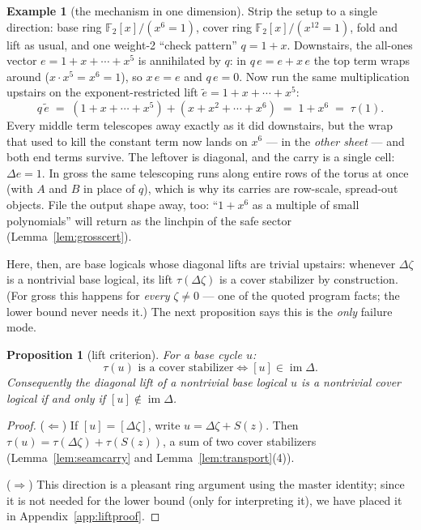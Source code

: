 \documentclass[11pt]{article}
\theoremstyle{plain}
\newtheorem{proposition}[theorem]{Proposition}
\theoremstyle{definition}
\newtheorem{example}[theorem]{Example}
\theoremstyle{remark}
\newcommand{\F}{\mathbb{F}}
\newcommand{\imD}{\operatorname{im}\Delta}
\begin{document}
\begin{example}[the mechanism in one dimension]\label{ex:1d}
Strip the setup to a single direction: base ring $\F_2[x]/(x^{6}{=}1)$,
cover ring $\F_2[x]/(x^{12}{=}1)$, fold and lift as usual, and one weight-2
``check pattern'' $q = 1 + x$. Downstairs, the all-ones vector
$e = 1 + x + \cdots + x^5$ is annihilated by $q$: in $q\,e = e + x\,e$ the
top term wraps around ($x \cdot x^5 = x^6 = 1$), so $x\,e = e$ and
$q\,e = 0$. Now run the same multiplication upstairs on the
exponent-restricted lift $\widetilde e = 1 + x + \cdots + x^5$:
\[
q\,\widetilde e
\;=\; (1 + x + \cdots + x^5) + (x + x^2 + \cdots + x^6)
\;=\; 1 + x^6 \;=\; \tau(1).
\]
Every middle term telescopes away exactly as it did downstairs, but the
wrap that used to kill the constant term now lands on $x^6$ --- in the
\emph{other sheet} --- and both end terms survive. The leftover is
diagonal, and the carry is a single cell: $\Delta e = 1$. In gross the same
telescoping runs along entire rows of the torus at once (with $A$ and $B$
in place of $q$), which is why its carries are row-scale, spread-out
objects. File the output shape away, too: ``$1 + x^6$ as a multiple of
small polynomials'' will return as the linchpin of the safe sector
(Lemma~\ref{lem:grosscert}).
\end{example}

Here, then, are base logicals whose diagonal lifts are trivial upstairs:
whenever $\Delta\zeta$ is a nontrivial base logical, its lift
$\tau(\Delta\zeta)$ is a cover stabilizer by construction. (For gross this
happens for \emph{every} $\zeta \neq 0$ --- one of the quoted program
facts; the lower bound never needs it.) The next proposition says this is
the \emph{only} failure mode.

\begin{proposition}[lift criterion]\label{prop:lift}
For a base cycle $u$:
\[
\tau(u) \text{ is a cover stabilizer} \iff [u] \in \imD .
\]
Consequently the diagonal lift of a nontrivial base logical $u$ is a
nontrivial cover logical if and only if $[u] \notin \imD$.
\end{proposition}

\begin{proof}
($\Leftarrow$) If $[u] = [\Delta\zeta]$, write $u = \Delta\zeta + S(z)$. Then
$\tau(u) = \tau(\Delta\zeta) + \tau(S(z))$, a sum of two cover stabilizers
(Lemma~\ref{lem:seamcarry} and Lemma~\ref{lem:transport}(4)).

($\Rightarrow$) This direction is a pleasant ring argument using the master
identity; since it is not needed for the lower bound (only for interpreting
it), we have placed it in Appendix~\ref{app:liftproof}.
\end{proof}
\end{document}
